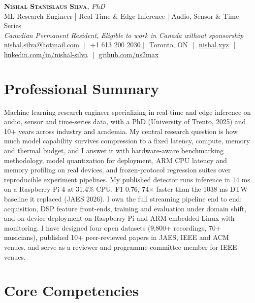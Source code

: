 \documentclass[11pt]{article}
\makeatletter
\newcommand{\cvName}{Nishal Stanislaus Silva}
\newcommand{\cvEmail}{nishal.silva@hotmail.com}
\newcommand{\cvPhone}{+1 613 200 2030}
\newcommand{\cvCity}{Toronto, ON}
\newcommand{\cvSite}{https://nishal.xyz}
\newcommand{\cvLinkedIn}{https://www.linkedin.com/in/nishal-silva}
\newcommand{\cvGitHub}{https://github.com/ns2max}
\newcommand{\cvStatus}{Canadian Permanent Resident, Eligible to work in Canada without sponsorship}
\newcommand{\cvTagline}{ML Research Engineer | Real-Time \& Edge Inference | Audio, Sensor \& Time-Series}
\makeatother
\begin{document}
\pagestyle{empty}
\begin{center}
    {\LARGE \scshape \textbf{\cvName}}{\large \textit{, PhD}}\\[1pt]
    {\small \cvTagline}\\[1pt]
    {\footnotesize\textit{\cvStatus}}\\[1pt]
    {\small
    \href{mailto:\cvEmail}{\cvEmail} \,\,|\,\, \cvPhone \,\,|\,\, \cvCity
    \,\,|\,\, \href{\cvSite}{nishal.xyz} \,\,|\,\, \href{\cvLinkedIn}{linkedin.com/in/nishal-silva}
    \,\,|\,\, \href{\cvGitHub}{github.com/ns2max}}
\end{center}

\section*{Professional Summary}

Machine learning research engineer specializing in real-time and edge inference on audio, sensor and time-series data, with a PhD (University of Trento, 2025) and 10+ years across industry and academia. My central research question is how much model capability survives compression to a fixed latency, compute, memory and thermal budget, and I answer it with hardware-aware benchmarking methodology, model quantization for deployment, ARM CPU latency and memory profiling on real devices, and frozen-protocol regression suites over reproducible experiment pipelines. My published detector runs inference in 14 ms on a Raspberry Pi 4 at 31.4\% CPU, F1 0.76, 74$\times$ faster than the 1038 ms DTW baseline it replaced (JAES 2026). I own the full streaming pipeline end to end: acquisition, DSP feature front-ends, training and evaluation under domain shift, and on-device deployment on Raspberry Pi and ARM embedded Linux with monitoring. I have designed four open datasets (9,800+ recordings, 70+ musicians), published 10+ peer-reviewed papers in JAES, IEEE and ACM venues, and serve as a reviewer and programme-committee member for IEEE venues.

\section*{Core Competencies}
\end{document}
